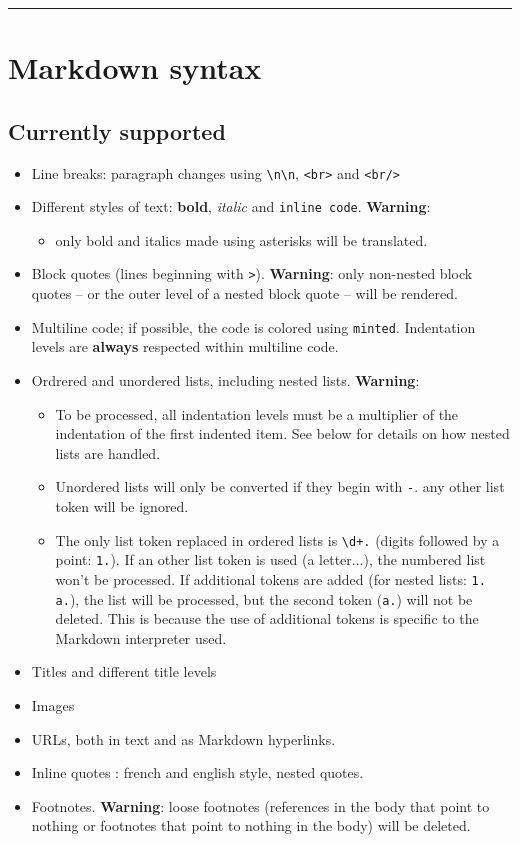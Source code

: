 \documentclass[a4paper, 12pt, twoside]{book}
\begin{document}
\par\noindent\rule{\linewidth}{0.4pt}
\section*{Markdown syntax}
\subsection*{Currently supported}

\begin{itemize}
\item Line breaks: paragraph changes using \texttt{\textbackslash{}n\textbackslash{}n}, \texttt{<br\textgreater{}} and \texttt{<br/\textgreater{}}
\item Different styles of text: \textbf{bold}, \textit{italic} and \texttt{inline code}. \textbf{Warning}:
\begin{itemize} 
 \item only bold and italics made using asterisks will be translated.
\end{itemize}
\item Block quotes (lines beginning with \texttt{\textgreater{}}). \textbf{Warning}: only non-nested block quotes -- or the outer level of a nested block quote -- will be rendered.
\item Multiline code; if possible, the code is colored using \texttt{minted}. Indentation levels are \textbf{always} respected within multiline code.
\item Ordrered and unordered lists, including nested lists. \textbf{Warning}:
\begin{itemize} 
 \item To be processed, all indentation levels must be a multiplier of the indentation of the first indented item. See below for details on how nested lists are handled.
\item Unordered lists will only be converted if they begin with \texttt{-}. any other list token will be ignored.
\item The only list token replaced in ordered lists is \texttt{\textbackslash{}d+.} (digits followed by a point: \texttt{1.}). If an other list token is used (a letter...), the numbered list won't be processed. If additional tokens are added (for nested lists: \texttt{1. a.}), the list will be processed, but the second token (\texttt{a.}) will not be deleted. This is because the use of additional tokens is specific to the Markdown interpreter used.
\end{itemize}
\item Titles and different title levels
\item Images
\item URLs, both in text and as Markdown hyperlinks.
\item Inline quotes : french and english style, nested quotes.
\item Footnotes. \textbf{Warning}: loose footnotes (references in the body that point to nothing or footnotes that point to nothing in the body) will be deleted. 
\end{itemize}
\end{document}
